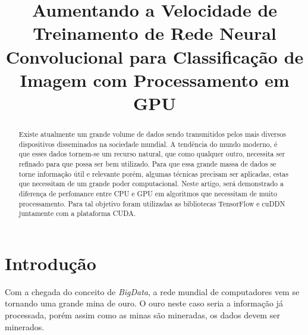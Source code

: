 \documentclass[conference]{IEEEtran}
\begin{document}
	\title{Aumentando a Velocidade de Treinamento de Rede Neural Convolucional para Classifica\c{c}\~ao de Imagem com Processamento em GPU}
	
	\author{
		\and
		\and
		}
	
	\maketitle
	
	\begin{abstract}
		Existe atualmente um grande volume de dados sendo transmitidos pelos mais diversos dispositivos disseminados na sociedade mundial. A tend\^encia do mundo moderno, \'e que esses dados tornem-se um recurso natural, que como qualquer outro, necessita ser refinado para que possa ser bem utilizado. Para que essa grande massa de dados se torne informa\c{c}\~ao \'util e relevante por\'em, algumas técnicas precisam ser aplicadas, estas que necessitam de um grande poder computacional. Neste artigo, será demonstrado a diferen\c{c}a de perfomance entre CPU e GPU em algoritmos que necessitam de muito processamento. Para tal objetivo foram utilizadas as bibliotecas TensorFlow e cuDDN juntamente com a plataforma CUDA. 
	\end{abstract}
	
	\IEEEpeerreviewmaketitle
	
	
	\section{Introdu\c{c}\~ao}
	Com a chegada do conceito de \textit{BigData}, a rede mundial de computadores vem se tornando uma grande mina de ouro. O ouro neste caso seria a informa\c{c}\~ao j\'a processada, por\'em assim como as minas s\~ao mineradas, os dados devem ser minerados.
	
\end{document}
